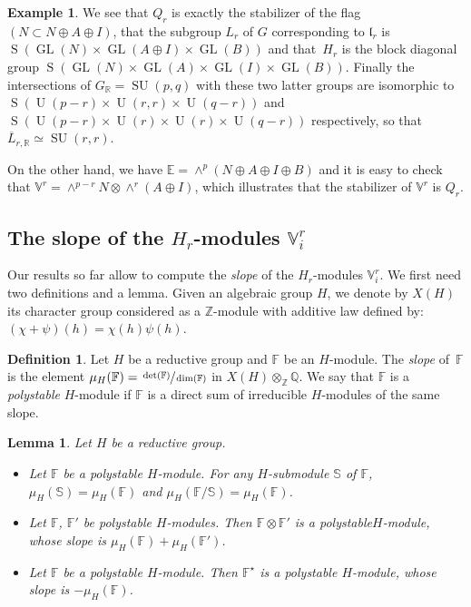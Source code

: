 \documentclass[JEP,XML,SOM,Unicode,NoFloatCountersInSection]{cedram}
\theoremstyle{plain}
\newtheorem{lemm}[theo]{Lemma}
\theoremstyle{definition}
\newtheorem{defi}[theo]{Definition}
\newtheorem{exem}[theo]{Example}
\let\ov\overline
\let\rgy r
\DeclareMathOperator{\GL}{GL}
\DeclareMathOperator{\rS}{S}
\DeclareMathOperator{\SU}{SU}
\DeclareMathOperator{\rU}{U}
\newcommand{\bE}{\mathbb{E}}
\newcommand{\bF}{\mathbb{F}}
\newcommand{\bS}{\mathbb{S}}
\newcommand{\bZ}{\mathbb{Z}}
\newcommand{\bR}{\mathbb{R}}
\newcommand{\bQ}{\mathbb{Q}}
\newcommand{\Vr}{\mathbb{V}^\rgy}
\newcommand{\fl}{\mathfrak{l}}
\begin{document}
\begin{exem}
We see that $Q_\rgy$ is exactly the stabilizer of the flag $(N \subset N \oplus A \oplus I)$, that
the subgroup $L_\rgy$ of $G$ corresponding to $\fl_\rgy$ is $\rS(\GL(N)\times\GL(A\oplus
I)\times\GL(B))$ and that~$H_\rgy$ is the block diagonal group $\rS(\GL(N) \times \GL(A) \times \GL(I) \times \GL(B))$.
Finally the intersections of $G_\bR=\SU(p,q)$ with these two latter groups are isomorphic to
$\rS(\rU(p-\rgy)\times\rU(\rgy,\rgy)\times\rU(q-\rgy))$ and $\rS(\rU(p-\rgy) \times \rU(\rgy)
\times \rU(\rgy) \times \rU(q-\rgy))$ respectively, so that
$\ov{L}_{\rgy,\bR}\simeq\SU(\rgy,\rgy)$.

On the other hand, we have $\bE=\wedge^p(N \oplus A \oplus I \oplus B)$ and it is easy to check that
$\Vr=\wedge^{p-\rgy}N \otimes \wedge^\rgy(A \oplus I)$, which illustrates that the stabilizer
of $\Vr$ is $Q_\rgy$.

\subsection{\texorpdfstring{The slope of the $H_\rgy$-modules $\Vr_i$}{The slope of the H-r modules V-r-i}}
\label{subsec:slopeVi}

Our results so far allow to compute the \emph{slope} of the $H_\rgy$-modules $\Vr_i$. We first need two
definitions and a lemma. Given an algebraic group $H$, we denote by $X(H)$ its character group
considered as a $\bZ$-module with additive law defined by: $(\chi+\psi)(h)=\chi(h)\psi(h)$.

\begin{defi}
\label{defi:polystable}
Let $H$ be a reductive group and $\bF$ be an $H$-module.
The \emph{slope} of~$\bF$ is the element $\mu_H(\bF)=\sfrac{\det(\bF)}{\dim(\bF)}$ in $X(H) \otimes_\bZ \bQ$.
We say that $\bF$ is a \emph{polystable} $H$-module if $\bF$ is a direct sum of irreducible
$H$-modules of the same slope.
\end{defi}

\begin{lemm}
\label{lemm:polystable}
Let $H$ be a reductive group.
\begin{itemize}
\item Let $\bF$ be a polystable $H$-module. For any $H$-submodule $\bS$ of $\bF$,
$\mu_H(\bS)=\mu_H(\bF)$ and $\mu_H(\bF/\bS)=\mu_H(\bF)$.
\item Let $\bF$, $\bF'$ be polystable $H$-modules. Then $\bF \otimes \bF'$ is a polystable$H$-module,
whose slope is $\mu_H(\bF)+\mu_H(\bF')$.
\item Let $\bF$ be a polystable $H$-module. Then $\bF^\star$ is a polystable
$H$-module, whose slope is $-\mu_H(\bF)$.
\end{itemize}
\end{lemm}


\end{exem}
\end{document}
